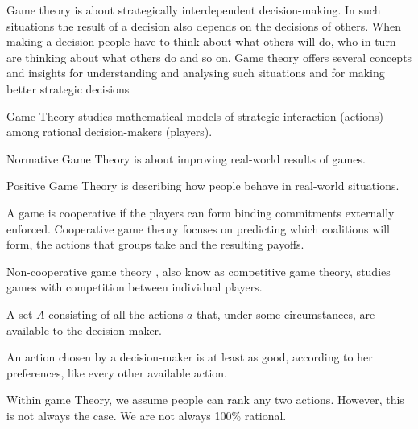 Game theory is about strategically interdependent decision-making. In such situations the result of a decision also depends on the decisions of others. When making a decision people have to think about what others will do, who in turn are thinking about what others do and so on. Game theory offers several concepts and insights for understanding and analysing such situations and for making better strategic decisions

\begin{definition}
      Game Theory studies mathematical models of strategic interaction (actions) among rational decision-makers (players).
\end{definition}


\begin{definition}
      Normative Game Theory is about improving real-world results of games.
\end{definition}


\begin{definition}
      Positive Game Theory is describing how people behave in real-world situations.
\end{definition}


\begin{definition}
      A game is cooperative if the players can form binding commitments externally enforced. Cooperative game theory focuses on predicting which coalitions will form, the actions that groups take and the resulting payoffs.

      Non-cooperative game theory , also know as competitive game theory, studies games with competition between individual players.
\end{definition}

\begin{definition}[Action]
      A set $A$ consisting of all the actions $a$ that, under some circumstances, are available to the decision-maker.
\end{definition}


\begin{definition}
      An action chosen by a decision-maker is at least as good, according to her preferences, like every other available action.
\end{definition}


\begin{note}
      \normalfont  Within game Theory, we assume people can rank any two actions. However, this is not always the case. We are not always 100\% rational.
\end{note}


